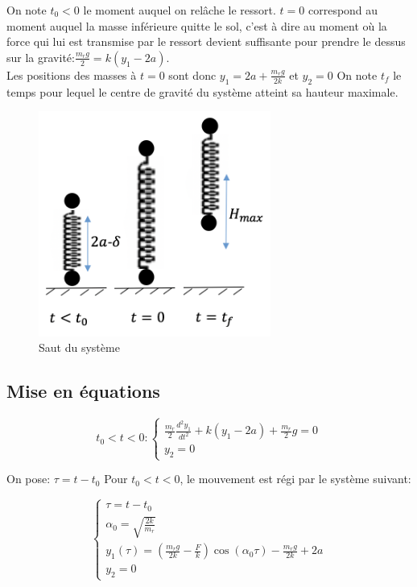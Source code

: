 On note $t_0<0$ le moment auquel on relâche le ressort. $t=0$ correspond au moment auquel la masse inférieure quitte le sol, c'est à dire au moment où la force qui lui est transmise par le ressort devient suffisante pour prendre le dessus sur la gravité:$\frac{m_r g}{2}=k(y_1-2a)$. \\
Les positions des masses à $t=0$ sont donc $y_1=2a+\frac{m_r g}{2k}$ et $y_2=0$
On note $t_f$ le temps pour lequel le centre de gravité du système atteint sa hauteur maximale.

\begin{figure}[htb]
\centering
\includegraphics[width=3in]{images_2ddl/saut.png}
\caption{Saut du système}
\label{fig:saut}
\end{figure}

\subsection{Mise en équations}
\begin{equation}
   t_0<t<0: 
  \begin{cases}
    \frac{m_r}{2}\frac{d^2y_1}{dt^2}+k(y_1-2a)+\frac{m_r}{2}g=0\\
    y_2=0
  \end{cases}
  \label{eq:1}
\end{equation}

On pose: $\tau=t-t_0$
Pour $t_0<t<0$, le mouvement est régi par le système suivant:

\begin{equation}
  \begin{cases}
    \tau=t-t_0 \\
    \alpha_0=\sqrt{\frac{2k}{m_r}}\\
    y_1(\tau)=(\frac{m_r g}{2k}-\frac{F}{k})\cos(\alpha_0 \tau)-\frac{m_r g}{2k}+2a \\
    y_2=0
  \end{cases}
  \label{eq:2}
\end{equation}

